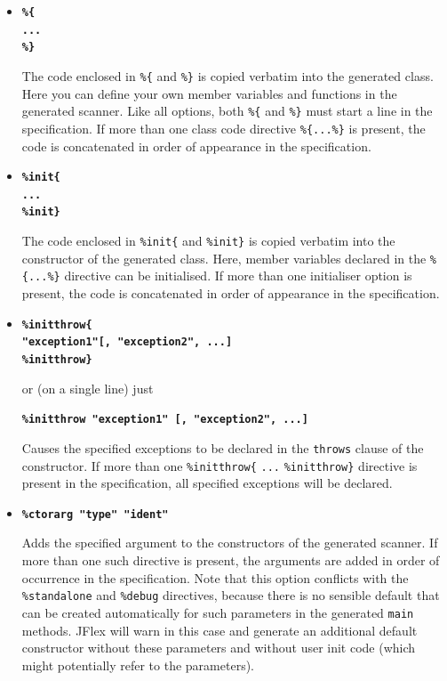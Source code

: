 \documentclass[11pt]{scrartcl}
\begin{document}
\begin{itemize}
\item
{\bfseries \verb+%{+}\\ \textbf{\texttt{...}}\\ {\bfseries \verb+%}+}

The code enclosed in \verb+%{+ and \verb+%}+ is copied verbatim
into the generated class. Here you can define your own member variables
and functions in the generated scanner. Like all options, both \verb+%{+
and \verb+%}+ must start a line in the specification. If more than one
class code directive \verb+%{...%}+ is present, the code is concatenated
in order of appearance in the specification.
 
\item
{\bfseries \verb+%init{+}\\
\textbf{\texttt{...}}\\
{\bfseries \verb+%init}+}

The code enclosed in \verb+%init{+ and \verb+%init}+ is copied
verbatim into the constructor of the generated class. Here, member
variables declared in the \verb+%{...%}+ directive can be initialised.
If more than one initialiser option is present, the code is concatenated
in order of appearance in the specification.
 
\item
{\bfseries \verb+%initthrow{+}\\
{\bfseries \texttt{"exception1"[, "exception2", ...]}}\\
{\bfseries \verb+%initthrow}+}

or (on a single line) just

{\bfseries \texttt{\%initthrow "exception1" [,  "exception2", ...]}}

Causes the specified exceptions to be declared in the \texttt{throws}
clause of the constructor. If more than one \verb+%initthrow{+ \texttt{...} \verb+%initthrow}+
directive is present in the specification, all specified exceptions will
be declared.

\item
{\bfseries \texttt{\%ctorarg "type" "ident"}}

Adds the specified argument to the constructors of the generated scanner. 
If more than one such directive is present, the arguments are added in order
of occurrence in the specification. Note that this option conflicts with
the \verb+%standalone+ and \verb+%debug+ directives, because there is no
sensible default that can be created automatically for such parameters 
in the generated \texttt{main} methods. JFlex will warn in this case and
generate an additional default constructor without these parameters and without user init code (which might potentially refer to the parameters).


\end{itemize}
\end{document}
